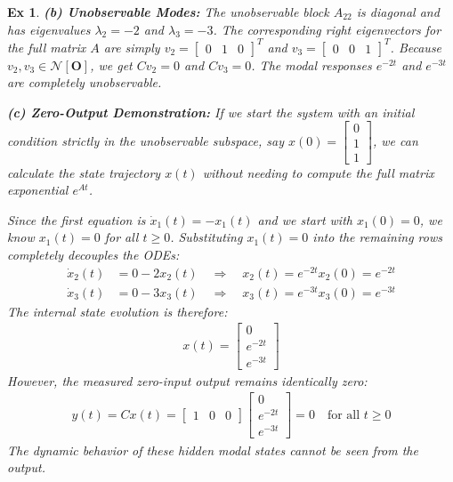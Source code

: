 \documentclass[twoside]{article}
\newtheorem{exmp}[theorem]{Ex}
\begin{document}
\begin{exmp}
\textbf{(b) Unobservable Modes:} The unobservable block $A_{22}$ is diagonal and has eigenvalues $\lambda_2 = -2$ and $\lambda_3 = -3$. The corresponding right eigenvectors for the full matrix $A$ are simply $v_2 = \begin{bmatrix} 0 & 1 & 0 \end{bmatrix}^T$ and $v_3 = \begin{bmatrix} 0 & 0 & 1 \end{bmatrix}^T$. Because $v_2, v_3 \in \mathcal{N}[\mathbf{O}]$, we get $C v_2 = 0$ and $C v_3 = 0$. The modal responses $e^{-2t}$ and $e^{-3t}$ are completely unobservable. 

\textbf{(c) Zero-Output Demonstration:} If we start the system with an initial condition strictly in the unobservable subspace, say $x(0) = \begin{bmatrix} 0 \\ 1 \\ 1 \end{bmatrix}$, we can calculate the state trajectory $x(t)$ without needing to compute the full matrix exponential $e^{At}$. 

Since the first equation is $\dot{x}_1(t) = -x_1(t)$ and we start with $x_1(0) = 0$, we know $x_1(t) = 0$ for all $t \ge 0$. Substituting $x_1(t) = 0$ into the remaining rows completely decouples the ODEs:
\begin{align*}
    \dot{x}_2(t) &= 0 - 2x_2(t) \quad \Rightarrow \quad x_2(t) = e^{-2t} x_2(0) = e^{-2t} \\
    \dot{x}_3(t) &= 0 - 3x_3(t) \quad \Rightarrow \quad x_3(t) = e^{-3t} x_3(0) = e^{-3t}
\end{align*}
The internal state evolution is therefore:
\begin{align*}
    x(t) = \begin{bmatrix} 0 \\ e^{-2t} \\ e^{-3t} \end{bmatrix}
\end{align*}
However, the measured zero-input output remains identically zero:
\begin{align*}
    y(t) = C x(t) = \begin{bmatrix} 1 & 0 & 0 \end{bmatrix} \begin{bmatrix} 0 \\ e^{-2t} \\ e^{-3t} \end{bmatrix} = 0 \quad \text{for all } t \ge 0
\end{align*}
The dynamic behavior of these hidden modal states cannot be seen from the output.
\end{exmp}
\end{document}
